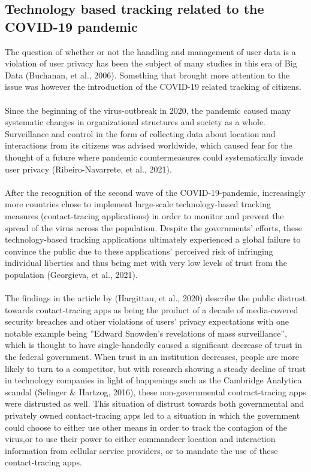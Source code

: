 \documentclass[11pt]{article}
\begin{document}
\subsection{Technology based tracking related to the COVID-19 pandemic}
The question of whether or not the handling and management of user data is a violation of user privacy has been the subject of many studies in this era of Big Data (Buchanan, et al., 2006). Something that brought more attention to the issue was however the introduction of the COVID-19 related tracking of citizens.
\\ \\
Since the beginning of the virus-outbreak in 2020, the pandemic caused many systematic changes in organizational structures and society as a whole. Surveillance and control in the form of collecting data about location and interactions from its citizens was advised worldwide, which caused fear for the thought of a future where pandemic countermeasures could systematically invade user privacy (Ribeiro-Navarrete, et al., 2021). 
\\ \\
After the recognition of the second wave of the COVID-19-pandemic, increasingly more countries chose to implement large-scale technology-based tracking measures (contact-tracing applications) in order to monitor and prevent the spread of the virus across the population. Despite the governments’ efforts, these technology-based tracking applications ultimately experienced a global failure to convince the public due to these applications’ perceived risk of infringing individual liberties and thus being met with very low levels of trust from the population (Georgieva, et al., 2021). 
\\ \\
The findings in the article by (Hargittau, et al., 2020) describe the public distrust towards contact-tracing apps as being the product of a decade of media-covered security breaches and other violations of users’ privacy expectations with one notable example being ”Edward Snowden’s revelations of mass surveillance”, which is thought to have single-handedly caused a significant decrease of trust in the federal government. When trust in an institution decreases, people are more likely to turn to a competitor, but with research showing a steady decline of trust in technology companies in light of happenings such as the Cambridge Analytica scandal (Selinger & Hartzog, 2016), these non-governmental contract-tracing apps were distrusted as well.
This situation of distrust towards both governmental and privately owned contact-tracing apps led to a situation in which the government could choose to either use other means in order to track the contagion of the virus,or to use their power to either commandeer location and interaction information from cellular service providers, or to mandate the use of these contact-tracing apps.
\end{document}
